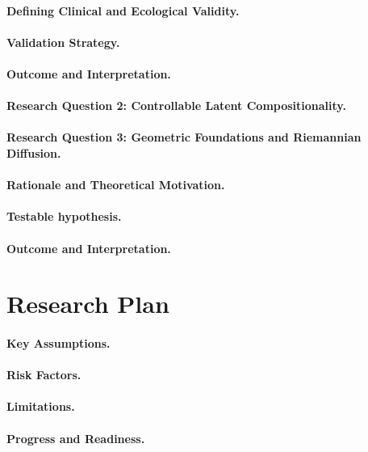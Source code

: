 \paragraph{Defining Clinical and Ecological Validity.}

\paragraph{Validation Strategy.}

\paragraph{Outcome and Interpretation.}

\paragraph{Research Question 2: Controllable Latent Compositionality.}

\paragraph{Research Question 3: Geometric Foundations and Riemannian Diffusion.}

\paragraph{Rationale and Theoretical Motivation.}

\paragraph{Testable hypothesis.}

\paragraph{Outcome and Interpretation.}

\section{Research Plan}
\label{sec:research_plan}

\paragraph{Key Assumptions.}

\paragraph{Risk Factors.}

\paragraph{Limitations.}

\paragraph{Progress and Readiness.}
